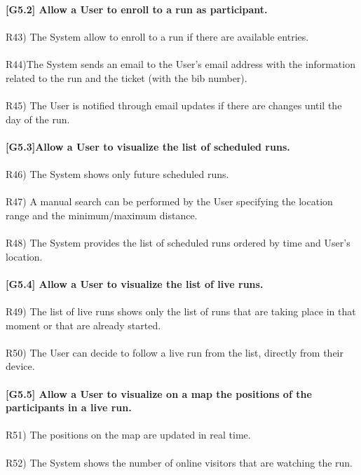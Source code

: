 \textbf{[G5.2] Allow a User to enroll to a run as participant.} \\ \\
R43) The System allow to enroll to a run if there are available entries. \\ \\
R44)The System sends an email to the User’s email address with the information related to the run and the ticket (with the bib number). \\ \\
R45) The User is notified through email updates if there are changes until the day of the run. \\ \\

\textbf{[G5.3]Allow a User to visualize the list of scheduled runs.} \\ \\
R46) The System shows only future scheduled runs. \\ \\ 
R47) A manual search can be performed by the User specifying the location range and the minimum/maximum distance. \\ \\ 
R48) The System provides the list of scheduled runs ordered by time and User’s location. \\ \\

\textbf{[G5.4] Allow a User to visualize the list of live runs.} \\ \\
R49) The list of live runs shows only the list of runs that are taking place in that moment or that are already started. \\ \\
R50) The User can decide to follow a live run from the list, directly from their device. \\ \\

\textbf{[G5.5] Allow a User to visualize on a map the positions of the participants in a live run.} \\ \\	
R51) The positions on the map are updated in real time. \\ \\
R52) The System shows the number of online visitors that are watching the run. \\



